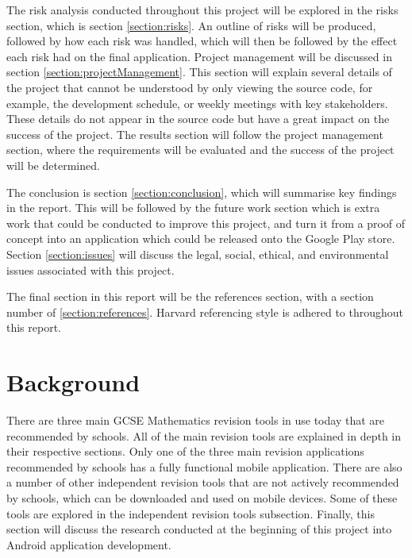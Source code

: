 \documentclass{article}
\begin{document}
The risk analysis conducted throughout this project will be explored in the risks section, which is section \ref{section:risks}. An outline of risks will be produced, followed by how each risk was handled, which will then be followed by the effect each risk had on the final application. Project management will be discussed in section \ref{section:projectManagement}. This section will explain several details of the project that cannot be understood by only viewing the source code, for example, the development schedule, or weekly meetings with key stakeholders. These details do not appear in the source code but have a great impact on the success of the project. The results section will follow the project management section, where the requirements will be evaluated and the success of the project will be determined. \par

The conclusion is section \ref{section:conclusion}, which will summarise key findings in the report. This will be followed by the future work section which is extra work that could be conducted to improve this project, and turn it from a proof of concept into an application which could be released onto the Google Play store. Section \ref{section:issues} will discuss the legal, social, ethical, and environmental issues associated with this project. \par

The final section in this report will be the references section, with a section number of \ref{section:references}. Harvard referencing style is adhered to throughout this report.\par

\section{Background}
\label{section:background}

There are three main GCSE Mathematics revision tools in use today that are recommended by schools. All of the main revision tools are explained in depth in their respective sections. Only one of the three main revision applications recommended by schools has a fully functional mobile application. There are also a number of other independent revision tools that are not actively recommended by schools, which can be downloaded and used on mobile devices. Some of these tools are explored in the independent revision tools subsection. Finally, this section will discuss the research conducted at the beginning of this project into Android application development. \par
\end{document}

